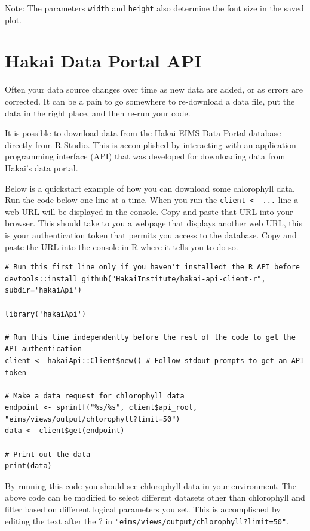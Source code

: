 \documentclass[]{book}
\begin{document}
Note: The parameters \texttt{width} and \texttt{height} also determine
the font size in the saved plot.

\chapter{Hakai Data Portal API}\label{hakai-data-portal-api}

Often your data source changes over time as new data are added, or as
errors are corrected. It can be a pain to go somewhere to re-download a
data file, put the data in the right place, and then re-run your code.

It is possible to download data from the Hakai EIMS Data Portal database
directly from R Studio. This is accomplished by interacting with an
application programming interface (API) that was developed for
downloading data from Hakai's data portal.

Below is a quickstart example of how you can download some chlorophyll
data. Run the code below one line at a time. When you run the
\texttt{client\ \textless{}-\ ...} line a web URL will be displayed in
the console. Copy and paste that URL into your browser. This should take
to you a webpage that displays another web URL, this is your
authentication token that permits you access to the database. Copy and
paste the URL into the console in R where it tells you to do so.

\begin{verbatim}
# Run this first line only if you haven't installedt the R API before
devtools::install_github("HakaiInstitute/hakai-api-client-r", subdir='hakaiApi')

library('hakaiApi')

# Run this line independently before the rest of the code to get the API authentication
client <- hakaiApi::Client$new() # Follow stdout prompts to get an API token

# Make a data request for chlorophyll data
endpoint <- sprintf("%s/%s", client$api_root, "eims/views/output/chlorophyll?limit=50")
data <- client$get(endpoint)

# Print out the data
print(data)
\end{verbatim}

By running this code you should see chlorophyll data in your
environment. The above code can be modified to select different datasets
other than chlorophyll and filter based on different logical parameters
you set. This is accomplished by editing the text after the ? in
\texttt{"eims/views/output/chlorophyll?limit=50"}.
\end{document}
